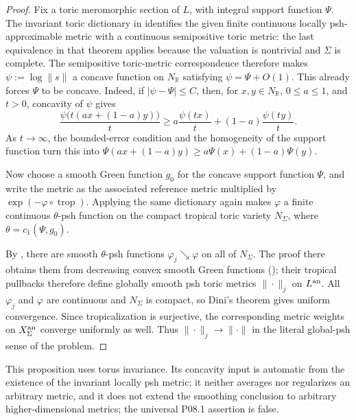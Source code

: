 \begin{proof}
Fix a toric meromorphic section of \(L\), with integral support function
\(\Psi\).  The invariant toric dictionary in
\cite[Theorem~5.3.11]{BGJKK25} identifies the given finite continuous
locally psh-approximable metric with a continuous semipositive toric
metric: the last equivalence in that theorem applies because the valuation
is nontrivial and \(\Sigma\) is complete.  The semipositive toric-metric
correspondence \cite[\S5.3.7]{BGJKK25} therefore makes
\(\psi:=\log\|s\|\) a concave function on \(N_\mathbb R\) satisfying
\(\psi=\Psi+O(1)\).  This already forces \(\Psi\) to be concave.  Indeed,
if \(|\psi-\Psi|\leq C\), then, for \(x,y\in N_\mathbb R\),
\(0\leq a\leq1\), and \(t>0\), concavity of \(\psi\) gives
\[
 \frac{\psi\bigl(t(ax+(1-a)y)\bigr)}{t}
 \geq a\frac{\psi(tx)}{t}+(1-a)\frac{\psi(ty)}{t}.
\]
As \(t\to\infty\), the bounded-error condition and the homogeneity of
the support function turn this into
\(\Psi(ax+(1-a)y)\geq a\Psi(x)+(1-a)\Psi(y)\).

Now choose a smooth Green function \(g_0\) for the concave support
function \(\Psi\), and write the metric as the associated reference
metric multiplied by \(\exp(-\varphi\circ\operatorname{trop})\).
Applying the same dictionary again makes \(\varphi\) a finite continuous
\(\theta\)-psh function on the compact tropical toric variety
\(N_\Sigma\), where \(\theta=c_1(\Psi,g_0)\).

By \cite[Corollary~5.4.5]{BGJKK25}, there are smooth
\(\theta\)-psh functions \(\varphi_j\searrow\varphi\) on all of
\(N_\Sigma\).  The proof there obtains them from decreasing convex smooth
Green functions (\cite[Theorem~5.4.4]{BGJKK25}); their tropical pullbacks
therefore define globally smooth psh toric metrics
\(\|\cdot\|_j\) on \(L^{\mathrm{an}}\).  All \(\varphi_j\) and \(\varphi\) are
continuous and \(N_\Sigma\) is compact, so Dini's theorem gives uniform
convergence.  Since tropicalization is surjective, the corresponding metric
weights on \(X_\Sigma^{\mathrm{an}}\) converge uniformly as well.  Thus
\(\|\cdot\|_j\to\|\cdot\|\) in the literal global-psh sense of the
problem.
\end{proof}

This proposition uses torus invariance.  Its concavity input is automatic
from the existence of the invariant locally psh metric; it neither averages
nor regularizes an arbitrary metric, and it does not extend the smoothing conclusion to arbitrary
higher-dimensional metrics; the universal P08.1 assertion is false.

